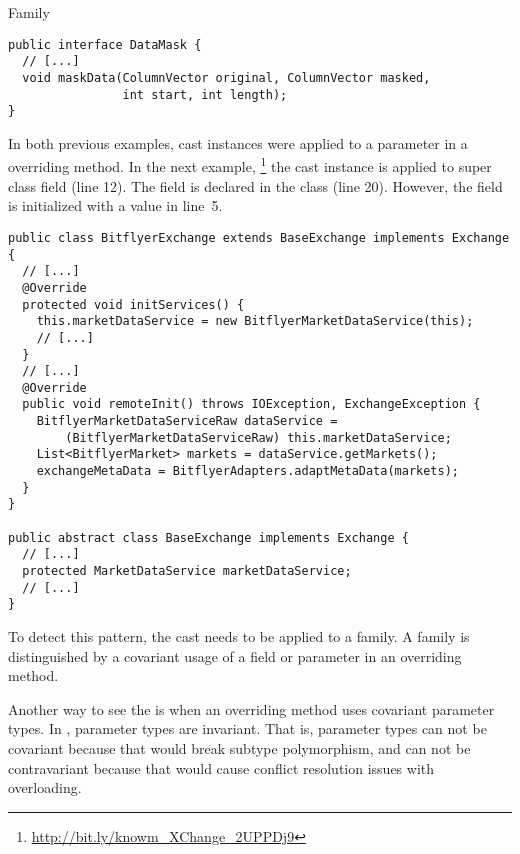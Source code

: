 \begin{pattern}{Family}
\begin{verbatim}
public interface DataMask {
  // [...]
  void maskData(ColumnVector original, ColumnVector masked,
                int start, int length);
}

\end{verbatim}

In both previous examples,
cast instances were applied to a parameter in a overriding method.
In the next example,%
\footnote{\url{http://bit.ly/knowm_XChange_2UPPDj9}}
the cast instance is applied to super class field (line 12).
The field is declared in the  class (line 20).
However, the field is initialized with a  value in line~5.

\begin{verbatim}
public class BitflyerExchange extends BaseExchange implements Exchange {
  // [...]
  @Override
  protected void initServices() {
    this.marketDataService = new BitflyerMarketDataService(this);
    // [...]
  }
  // [...]
  @Override
  public void remoteInit() throws IOException, ExchangeException {
    BitflyerMarketDataServiceRaw dataService =
        (BitflyerMarketDataServiceRaw) this.marketDataService;
    List<BitflyerMarket> markets = dataService.getMarkets();
    exchangeMetaData = BitflyerAdapters.adaptMetaData(markets);
  }
}

public abstract class BaseExchange implements Exchange {
  // [...]
  protected MarketDataService marketDataService;
  // [...]
}
\end{verbatim}

\detection{}
To detect this pattern, the cast needs to be applied to a family.
A family is distinguished by a covariant usage of a field or parameter in an overriding method.

\discussion{}
Another way to see the \thisp{} is when an overriding method uses covariant parameter types.
In \java{}, parameter types are invariant.
That is, parameter types can not be covariant because that would break subtype polymorphism,
and can not be contravariant because that would cause conflict resolution issues with overloading.

\cite{ernstFamilyPolymorphism2001}
\cite{nystromSoftwareCompositionMultiple}

\related{}


\end{pattern}